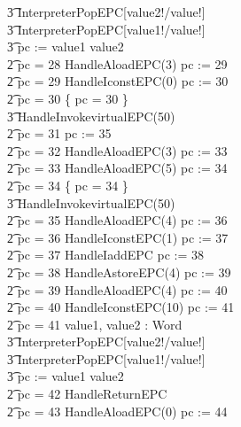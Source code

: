 \begin{figure}[tp!]
\begin{minipage}{0.5\textwidth}
{\begin{circus}
    \t3 \lschexpract InterpreterPopEPC[value2!/value!] \rschexpract \circseq \\
    \t3 \lschexpract InterpreterPopEPC[value1!/value!] \rschexpract \circseq \\
    \t3 pc := \IF value1 \leq value2   \\
    \t2 {} \circelse pc = 28 \circthen HandleAloadEPC(3) \circseq pc := 29 \\
    \t2 {} \circelse pc = 29 \circthen HandleIconstEPC(0) \circseq pc := 30 \\
    \t2 {} \circelse pc = 30 \circthen \{ pc = 30 \} \circseq \\
    \t3 HandleInvokevirtualEPC(50) \\
    \t2 {} \circelse pc = 31 \circthen pc := 35 \\
    \t2 {} \circelse pc = 32 \circthen HandleAloadEPC(3) \circseq pc := 33 \\
    \t2 {} \circelse pc = 33 \circthen HandleAloadEPC(5) \circseq pc := 34 \\
    \t2 {} \circelse pc = 34 \circthen \{ pc = 34 \} \circseq \\
    \t3 HandleInvokevirtualEPC(50) \\
    \t2 {} \circelse pc = 35 \circthen HandleAloadEPC(4) \circseq pc := 36 \\
    \t2 {} \circelse pc = 36 \circthen HandleIconstEPC(1) \circseq pc := 37 \\
    \t2 {} \circelse pc = 37 \circthen HandleIaddEPC \circseq pc := 38 \\
    \t2 {} \circelse pc = 38 \circthen HandleAstoreEPC(4) \circseq pc := 39 \\
    \t2 {} \circelse pc = 39 \circthen HandleAloadEPC(4) \circseq pc := 40 \\
    \t2 {} \circelse pc = 40 \circthen HandleIconstEPC(10) \circseq pc := 41 \\
    \t2 {} \circelse pc = 41 \circthen \circvar value1, value2 : Word \circspot \\
    \t3 \lschexpract InterpreterPopEPC[value2!/value!] \rschexpract \circseq \\
    \t3 \lschexpract InterpreterPopEPC[value1!/value!] \rschexpract \circseq \\
    \t3 pc := \IF value1 \leq value2   \\
    \t2 {} \circelse pc = 42 \circthen HandleReturnEPC \\
    \t2 {} \circelse pc = 43 \circthen HandleAloadEPC(0) \circseq pc := 44 \\

\end{circus}}
\end{minipage}
\end{figure}
